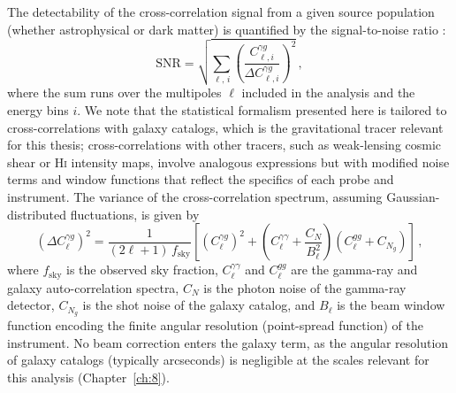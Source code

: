 The detectability of the cross-correlation signal from a given source population (whether astrophysical or dark matter) is quantified by the signal-to-noise ratio \cite{Fornengo:2013rga}:
\begin{equation}
	\mathrm{SNR} = \sqrt{\sum_{\ell,\, i} \left(\frac{C_{\ell,i}^{\gamma g}}{\Delta C_{\ell,i}^{\gamma g}}\right)^2}\,,
	\label{eq:snr}
\end{equation}
where the sum runs over the multipoles $\ell$ included in the analysis and the energy bins $i$.
We note that the statistical formalism presented here is tailored to cross-correlations with galaxy catalogs, which is the gravitational tracer relevant for this thesis; cross-correlations with other tracers, such as weak-lensing cosmic shear or \textsc{Hi} intensity maps, involve analogous expressions but with modified noise terms and window functions that reflect the specifics of each probe and instrument.
The variance of the cross-correlation spectrum, assuming Gaussian-distributed fluctuations, is given by \cite{Fornengo:2013rga}
\begin{equation}
	(\Delta C_\ell^{\gamma g})^2 = \frac{1}{(2\ell+1)\, f_\mathrm{sky}} \left[(C_\ell^{\gamma g})^2 + \left(C_\ell^{\gamma\gamma} + \frac{C_N}{B_\ell^2}\right)(C_\ell^{gg} + C_{N_g})\right]\,,
	\label{eq:variance_cross}
\end{equation}
where $f_\mathrm{sky}$ is the observed sky fraction, $C_\ell^{\gamma\gamma}$ and $C_\ell^{gg}$ are the gamma-ray and galaxy auto-correlation spectra, $C_N$ is the photon noise of the gamma-ray detector, $C_{N_g}$ is the shot noise of the galaxy catalog, and $B_\ell$ is the beam window function encoding the finite angular resolution (point-spread function) of the instrument.
No beam correction enters the galaxy term, as the angular resolution of galaxy catalogs (typically arcseconds) is negligible at the scales relevant for this analysis (Chapter~\ref{ch:8}).

